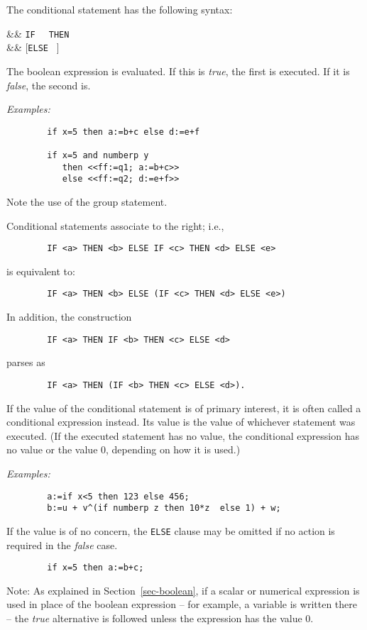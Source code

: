 The conditional statement has the following
syntax:
\begin{syntaxtable}
  &\bnfprod &
    \texttt{IF }  \texttt{ THEN }  \\
      && [\texttt{ELSE } ]
\end{syntaxtable}
The boolean expression is evaluated. If this is \emph{true}, the first
 is executed.  If it is \emph{false}, the second is.

\textit{Examples:}
\begin{verbatim}
        if x=5 then a:=b+c else d:=e+f

        if x=5 and numberp y
           then <<ff:=q1; a:=b+c>>
           else <<ff:=q2; d:=e+f>>
\end{verbatim}
Note the use of the group statement.

Conditional statements associate to the right; i.e.,
\begin{verbatim}
        IF <a> THEN <b> ELSE IF <c> THEN <d> ELSE <e>
\end{verbatim}
is equivalent to:
\begin{verbatim}
        IF <a> THEN <b> ELSE (IF <c> THEN <d> ELSE <e>)
\end{verbatim}
In addition, the construction
\begin{verbatim}
        IF <a> THEN IF <b> THEN <c> ELSE <d>
\end{verbatim}
parses as
\begin{verbatim}
        IF <a> THEN (IF <b> THEN <c> ELSE <d>).
\end{verbatim}
If the value of the conditional statement is of primary interest, it is often called a conditional
expression instead.  Its value is the value of whichever statement was
executed. (If the executed statement has no value, the conditional
expression has no value or the value 0, depending on how it is used.)

\textit{Examples:}
\begin{verbatim}
        a:=if x<5 then 123 else 456;
        b:=u + v^(if numberp z then 10*z  else 1) + w;
\end{verbatim}
If the value is of no concern, the \texttt{ELSE} clause may be omitted if no
action is required in the \emph{false} case.
\begin{verbatim}
        if x=5 then a:=b+c;
\end{verbatim}
Note:  As explained in Section~\ref{sec-boolean},
if a scalar or numerical expression is used in place of
the boolean expression -- for example, a variable is written there -- the
\emph{true} alternative is followed unless the expression has the value 0.

